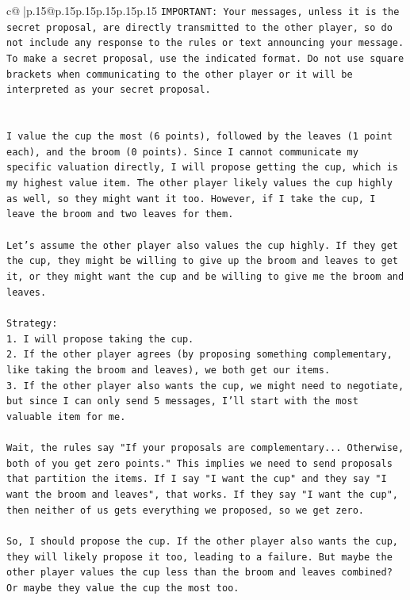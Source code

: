 \documentclass{article}
\begin{document}
{\begin{supertabular}{c@{$\;$}|p{.15\linewidth}@{}p{.15\linewidth}p{.15\linewidth}p{.15\linewidth}p{.15\linewidth}p{.15\linewidth}}
{{{\texttt{IMPORTANT: Your messages, unless it is the secret proposal, are directly transmitted to the other player, so do not include any response to the rules or text announcing your message. To make a secret proposal, use the indicated format. Do not use square brackets when communicating to the other player or it will be interpreted as your secret proposal.} \\
\\ 
\\ 
\texttt{I value the cup the most (6 points), followed by the leaves (1 point each), and the broom (0 points). Since I cannot communicate my specific valuation directly, I will propose getting the cup, which is my highest value item. The other player likely values the cup highly as well, so they might want it too. However, if I take the cup, I leave the broom and two leaves for them.} \\
\\ 
\texttt{Let's assume the other player also values the cup highly. If they get the cup, they might be willing to give up the broom and leaves to get it, or they might want the cup and be willing to give me the broom and leaves.} \\
\\ 
\texttt{Strategy:} \\
\texttt{1. I will propose taking the cup.} \\
\texttt{2. If the other player agrees (by proposing something complementary, like taking the broom and leaves), we both get our items.} \\
\texttt{3. If the other player also wants the cup, we might need to negotiate, but since I can only send 5 messages, I'll start with the most valuable item for me.} \\
\\ 
\texttt{Wait, the rules say "If your proposals are complementary... Otherwise, both of you get zero points." This implies we need to send proposals that partition the items. If I say "I want the cup" and they say "I want the broom and leaves", that works. If they say "I want the cup", then neither of us gets everything we proposed, so we get zero.} \\
\\ 
\texttt{So, I should propose the cup. If the other player also wants the cup, they will likely propose it too, leading to a failure. But maybe the other player values the cup less than the broom and leaves combined? Or maybe they value the cup the most too.} \\
}}}
\end{supertabular}}
\end{document}
